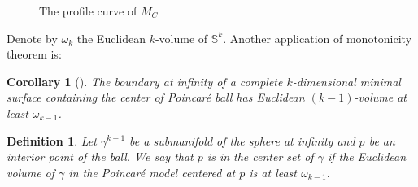 \documentclass[11pt]{article}
\newtheorem{corollary}[theorem]{Corollary}
\newtheorem{definition}[theorem]{Definition}
\begin{document}
\begin{figure}%
    \centering
    \qquad
    \caption{The profile curve of \( M_C \)}%
    \label{fig:min-HS}%
\end{figure}

Denote by  \(\omega_{k}\) the Euclidean \(k\)-volume of \(\mathbb{S}^{k}\). Another application of monotonicity theorem is:
\begin{corollary}[]
\label{cor:intro-2pi}
The boundary at infinity of a complete \(k\)-dimensional minimal surface containing the center of
Poincaré ball has Euclidean \((k-1)\)-volume at least \(\omega_{k-1}\).
\end{corollary}

\begin{definition}
Let  \(\gamma^{k-1}\) be a submanifold of the sphere at infinity and \(p\) be an interior
point of the ball. We say that \(p\) is in the \emph{center
set} of \(\gamma\) if the Euclidean volume of \(\gamma\) in the Poincaré model centered at \(p\) is at least \(\omega_{k-1}\).
\end{definition}
\end{document}
